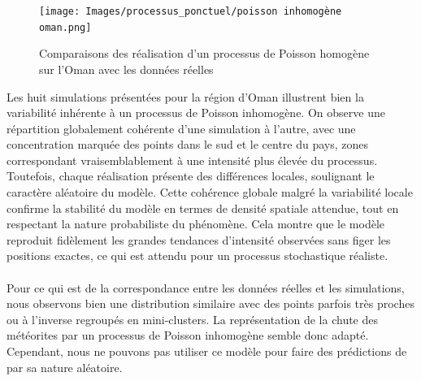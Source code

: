 \documentclass[12pt]{article}
\begin{document}
\begin{figure}[H]
    \centering
    \texttt{[image: Images/processus\_ponctuel/poisson inhomogène oman.png]}
    \caption{Comparaisons des réalisation d'un processus de Poisson homogène sur l'Oman avec les données réelles}
\end{figure}

Les huit simulations présentées pour la région d’Oman illustrent bien la variabilité inhérente à un processus de Poisson inhomogène. On observe une répartition globalement cohérente d’une simulation à l’autre, avec une concentration marquée des points dans le sud et le centre du pays, zones correspondant vraisemblablement à une intensité plus élevée du processus. Toutefois, chaque réalisation présente des différences locales, soulignant le caractère aléatoire du modèle. Cette cohérence globale malgré la variabilité locale confirme la stabilité du modèle en termes de densité spatiale attendue, tout en respectant la nature probabiliste du phénomène. Cela montre que le modèle reproduit fidèlement les grandes tendances d’intensité observées sans figer les positions exactes, ce qui est attendu pour un processus stochastique réaliste.\\
\\
Pour ce qui est de la correspondance entre les données réelles et les simulations, nous observons bien une distribution similaire avec des points parfois très proches ou à l'inverse regroupés en mini-clusters. La représentation de la chute des météorites par un processus de Poisson inhomogène semble donc adapté. Cependant, nous ne pouvons pas utiliser ce modèle pour faire des prédictions de par sa nature aléatoire.
\end{document}

